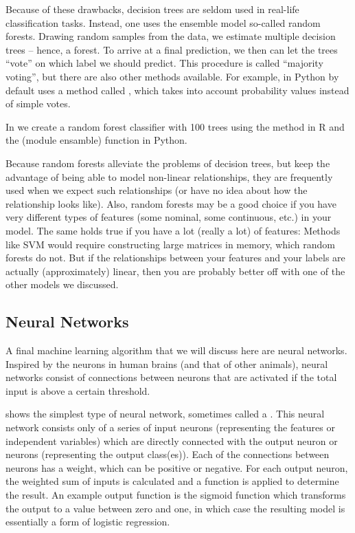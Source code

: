 Because of these drawbacks, decision trees are seldom used in
real-life classification tasks.  Instead, one uses the ensemble model so-called random forests.  Drawing random samples from the data, we estimate multiple
decision trees -- hence, a forest.  To arrive at a final prediction,
we then can let the trees ``vote'' on which label we should
predict. This procedure is called ``majority voting'', but there are
also other methods available. For example,  in Python  by default uses a method called , which takes into
account probability values instead of simple votes.

In  we create a random forest classifier with 100 trees using the  method  in R and the  (module ensamble) function  in Python.


Because random forests alleviate the problems of decision trees, but
keep the advantage of being able to model non-linear relationships,
they are frequently used when we expect such relationships (or have no
idea about how the relationship looks like).  Also, random forests may
be a good choice if you have very different types of features (some
nominal, some continuous, etc.) in your model. The same holds true if
you have a lot (really a lot) of features: Methods like SVM would require
constructing large matrices in memory, which random forests do not.
But if the relationships between your features and your labels are
actually (approximately) linear, then you are probably better off with
one of the other models we discussed.


\subsection{Neural Networks} \label{sec:neural}

A final machine learning algorithm that we will discuss here are neural networks.
Inspired by the neurons in human brains (and that of other animals),
neural networks consist of connections between neurons that are activated if the
total input is above a certain threshold.

 shows the simplest type of neural network, sometimes called a .
This neural network consists only of a series of input neurons (representing the features or independent variables)
which are directly connected with the output neuron or neurons (representing the output class(es)).
Each of the connections between neurons has a weight, which can be positive or negative.
For each output neuron, the weighted sum of inputs is calculated and a function is applied to determine the result.
An example output function is the sigmoid function which transforms the output to a value between zero and one,
in which case the resulting model is essentially a form of logistic regression.

